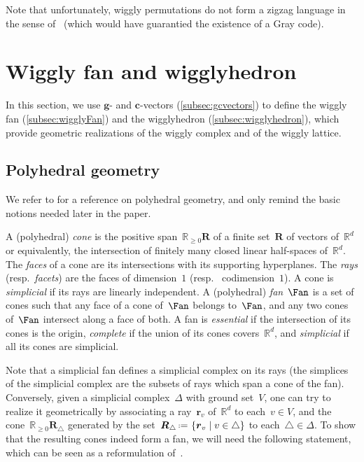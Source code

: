 \documentclass{amsart}
\theoremstyle{definition}
\newcommand{\R}{\mathbb{R}} %
\renewcommand{\b}[1]{{\boldsymbol{#1}}} %
\newcommand{\set}[2]{\left\{ #1 \;\middle|\; #2 \right\}} %
\newcommand{\eqdef}{\mbox{\,\raisebox{0.2ex}{\scriptsize\ensuremath{\mathrm:}}\ensuremath{=}\,}} %
\newcommand{\darkblue}{\color{darkblue}} %
\newcommand{\defn}[1]{\textsl{\darkblue #1}} %
\begin{document}
Note that unfortunately, wiggly permutations do not form a zigzag language in the sense of~\cite{HartungHoangMutzeWilliams} (which would have guarantied the existence of a Gray code).


\section{Wiggly fan and wigglyhedron}
\label{sec:geometry}

In this section, we use $\b{g}$- and $\b{c}$-vectors (\cref{subsec:gcvectors}) to define the wiggly fan (\cref{subsec:wigglyFan}) and the wigglyhedron (\cref{subsec:wigglyhedron}), which provide geometric realizations of the wiggly complex and of the wiggly lattice.


\subsection{Polyhedral geometry}
\label{subsec:polyhedralGeometry}

We refer to \cite{Ziegler-polytopes} for a reference on polyhedral geometry, and only remind the basic notions needed later in the paper.

A (polyhedral) \defn{cone} is the positive span~$\R_{\ge 0}\b{R}$ of a finite set~$\b{R}$ of vectors of~$\R^d$ or equivalently, the intersection of finitely many closed linear half-spaces of~$\R^d.$ 
The \defn{faces} of a cone are its intersections with its supporting hyperplanes. 
The \defn{rays} (resp.~\defn{facets}) are the faces of dimension~$1$ (resp.~ codimension~$1$).
A cone is \defn{simplicial} if its rays are linearly independent.
A (polyhedral) \defn{fan}~$\Fan$ is a set of cones such that any face of a cone of~$\Fan$ belongs to~$\Fan$, and any two cones of~$\Fan$ intersect along a face of both. 
A fan is \defn{essential} if the intersection of its cones is the origin, \defn{complete} if the union of its cones covers~$\R^d$, and \defn{simplicial} if all its cones are simplicial.

Note that a simplicial fan defines a simplicial complex on its rays (the simplices of the simplicial complex are the subsets of rays which span a cone of the fan).
Conversely, given a simplicial complex~$\Delta$ with ground set~$V$, one can try to realize it geometrically by associating a ray~$\b{r}_v$ of~$\R^d$ to each~$v \in V$, and the cone~$\R_{\ge 0}\b{R}_\triangle$ generated by the set~$\b{R}_\triangle \eqdef \set{\b{r}_v}{v \in \triangle}$ to each~$\triangle \in \Delta$.
To show that the resulting cones indeed form a fan, we will need the following statement, which can be seen as a reformulation of~\cite[Coro.~4.5.20]{DeLoeraRambauSantos}.
\end{document}
